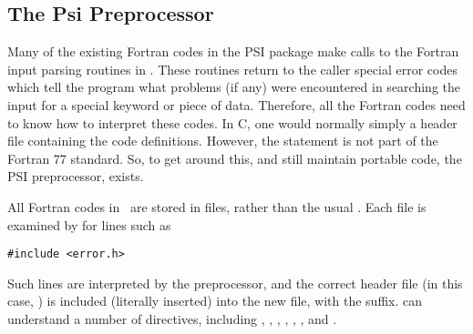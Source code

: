 \subsection{The Psi Preprocessor}\label{psipp}
Many of the existing Fortran codes in the PSI package make calls to the
Fortran input parsing routines in .  These routines return
to the caller special error codes which tell the program what problems (if
any) were encountered in searching the input for a special keyword or piece
of data.  Therefore, all the Fortran codes need to know how to interpret
these codes.  In C, one would normally simply  a header file
containing the code definitions.  However, the  statement is
not part of the Fortran 77 standard.  So, to get around this, and still
maintain portable code, the PSI preprocessor,  exists.

All Fortran codes in \PSIthree\ are stored in  files, rather than the
usual .  Each  file is examined by  for lines
such as
\begin{verbatim} 
#include <error.h>
\end{verbatim}
Such lines are interpreted by the preprocessor, and the correct header file
(in this case, ) is included (literally inserted) into the new
file, with the  suffix.   can understand a number of
directives, including , , , ,
, , and .

